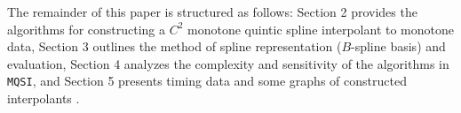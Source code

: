 The remainder of this paper is structured as follows: Section 2 provides
the algorithms for constructing a $C^2$ monotone quintic spline interpolant
to monotone data, Section 3 outlines the method of spline representation
($B$-spline basis) and evaluation, Section 4 analyzes the complexity and
sensitivity of the algorithms in {\tt MQSI}, and Section 5 presents 
timing data and some graphs of constructed interpolants .

